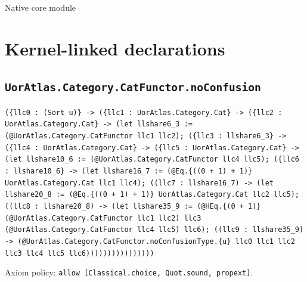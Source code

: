 \documentclass[11pt]{article}
\begin{document}
\begin{center}{\LARGE Native core module}\end{center}
\section*{Kernel-linked declarations}
\subsection*{\texttt{UorAtlas.Category.CatFunctor.noConfusion}}
\noindent\texttt{(\{llc0 : (Sort u)\} -> (\{llc1 : UorAtlas.Category.Cat\} -> (\{llc2 : UorAtlas.Category.Cat\} -> (let llshare6\_3 := (@UorAtlas.Category.CatFunctor llc1 llc2); (\{llc3 : llshare6\_3\} -> (\{llc4 : UorAtlas.Category.Cat\} -> (\{llc5 : UorAtlas.Category.Cat\} -> (let llshare10\_6 := (@UorAtlas.Category.CatFunctor llc4 llc5); (\{llc6 : llshare10\_6\} -> (let llshare16\_7 := (@Eq.\{((0 + 1) + 1)\} UorAtlas.Category.Cat llc1 llc4); ((llc7 : llshare16\_7) -> (let llshare20\_8 := (@Eq.\{((0 + 1) + 1)\} UorAtlas.Category.Cat llc2 llc5); ((llc8 : llshare20\_8) -> (let llshare35\_9 := (@HEq.\{(0 + 1)\} (@UorAtlas.Category.CatFunctor llc1 llc2) llc3 (@UorAtlas.Category.CatFunctor llc4 llc5) llc6); ((llc9 : llshare35\_9) -> (@UorAtlas.Category.CatFunctor.noConfusionType.\{u\} llc0 llc1 llc2 llc3 llc4 llc5 llc6))))))))))))))))}\par
\noindent Axiom policy: \texttt{allow [Classical.choice, Quot.sound, propext]}.\par
\end{document}
